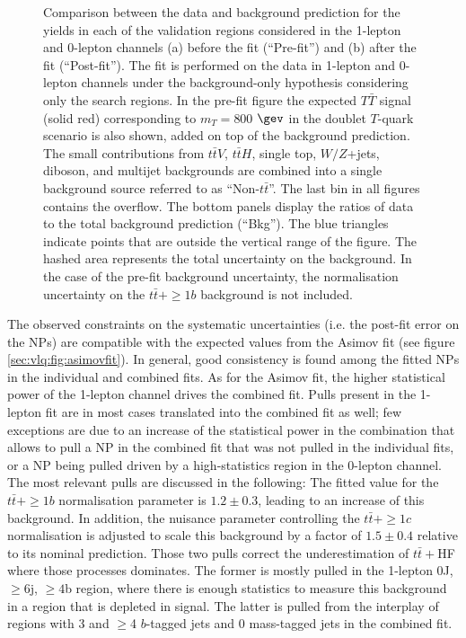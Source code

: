 \begin{figure}[p!]
\begin{subfigure}{0.5\textwidth}
  \caption{}
  \label{}
\end{subfigure}
\captionsetup{width=0.85\textwidth} \caption{\small Comparison between the data and background prediction for the yields in each of the validation regions considered in the 1-lepton and 0-lepton channels (a) before the fit (``Pre-fit'') and (b) after the fit (``Post-fit''). The fit is performed on the data in 1-lepton and 0-lepton channels under the background-only hypothesis considering only the search regions. In the pre-fit figure the expected $T\bar{T}$ signal (solid red) corresponding to $m_{T}=800$ $\gev$ in the doublet $T$-quark scenario is also shown, added on top of the background prediction. The small contributions from $t\bar{t}V$, $t\bar{t} H$, single top, $W/Z$+jets, diboson, and multijet backgrounds are combined into a single background source  referred to as ``Non-$t\bar{t}$''. The last bin in all figures contains the overflow. The bottom panels display the ratios of data to the total background prediction (``Bkg''). The blue triangles indicate points that are outside the vertical range of the figure. The hashed area represents the total uncertainty on the background. In the case of the pre-fit background uncertainty, the normalisation uncertainty on the $t\bar{t}+\ge1b$ background is not included.}
\label{sec:vlq:fig:VR}
\end{figure}


The observed constraints on the systematic uncertainties (i.e. the post-fit error on the NPs) are compatible with the expected values from the Asimov fit (see figure \ref{sec:vlq:fig:asimovfit}).  In general, good consistency is found among the fitted NPs in the individual and combined fits. As for the Asimov fit, the higher statistical power of the 1-lepton channel drives the combined fit. Pulls present in the 1-lepton fit are in most cases translated into the combined fit as well; few exceptions are due to an increase of the statistical power in the combination that allows to pull a NP in the combined fit that was not pulled in the individual fits, or a NP being pulled driven by a high-statistics region in the 0-lepton channel.
The most relevant pulls are discussed in the following:
\bi
 \ib The fitted value for the $t\bar{t}+\ge1b$ normalisation parameter is $1.2\pm0.3$, leading to an increase of this background. In addition, the nuisance parameter controlling the $t\bar{t}+\ge1c$ normalisation is adjusted to scale this background by a factor of $1.5\pm0.4$ relative to its nominal prediction. Those two pulls correct the underestimation of $t\bar{t}+$HF where those processes dominates. The former is mostly pulled in the 1-lepton $0$J, $\ge6$j, $\ge4$b region, where there is enough statistics to measure this background in a region that is depleted in signal. The latter is pulled from the interplay of regions with 3 and $\ge$4 $b$-tagged jets and 0 mass-tagged jets in the combined fit.
 
